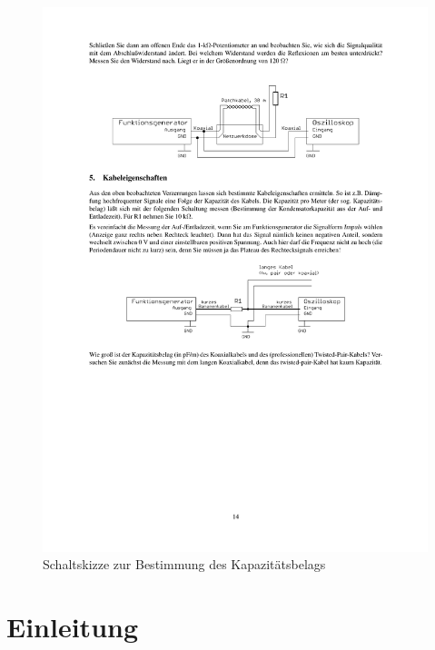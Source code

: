 \documentclass[12pt,a4paper]{article}
\begin{document}
\begin{figure}[H] 
  \centering
    \includegraphics[trim = 10mm 110mm 10mm 140mm, clip, scale = 1]{4-5.pdf}
  	\caption[Schaltskizze zur Bestimmung des Kapazitätsbelags]{Schaltskizze zur Bestimmung des Kapazitätsbelags\footnotemark}
  \label{fig:5}
\end{figure}

\newpage\section{Einleitung}
\end{document}
